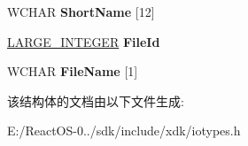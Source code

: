 \begin{DoxyCompactItemize}
W\+C\+H\+AR {\bfseries Short\+Name} \mbox{[}12\mbox{]}
\item 
\mbox{\label{struct___f_i_l_e___i_d___b_o_t_h___d_i_r___i_n_f_o_r_m_a_t_i_o_n_ad1a0608eb5f23df907683524cc1e492c}} 
\hyperlink{union___l_a_r_g_e___i_n_t_e_g_e_r}{L\+A\+R\+G\+E\+\_\+\+I\+N\+T\+E\+G\+ER} {\bfseries File\+Id}
\item 
\mbox{\label{struct___f_i_l_e___i_d___b_o_t_h___d_i_r___i_n_f_o_r_m_a_t_i_o_n_a485af48520b3f10bca2b6dbdf7701f9d}} 
W\+C\+H\+AR {\bfseries File\+Name} \mbox{[}1\mbox{]}
\end{DoxyCompactItemize}


该结构体的文档由以下文件生成\+:\begin{DoxyCompactItemize}
\item 
E\+:/\+React\+O\+S-\/0../sdk/include/xdk/iotypes.\+h\end{DoxyCompactItemize}

